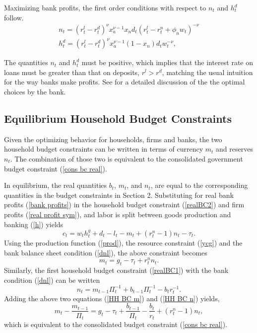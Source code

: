 \documentclass[]{article}
\begin{document}
Maximizing bank profits, the first order conditions with respect to $n_{t}$ and $h_{t}^{d}$ follow.
\begin{eqnarray}
  n_{t}=(r^l_{t}-r^d_{t})^{\nu}x_{a}^{\nu-1}x_{n}d_{t}(r^{l}_{t}-r^{n}_{t}+\phi_{n}w_{t})^{-\nu}  \label{foc n} \\ 
  h^{d}_{t}=(r^l_{t}-r^d_{t})^{\nu}x_{a}^{\nu-1}(1-x_{n})d_{t}w_{t}^{-\nu},  \label{foc hd}
\end{eqnarray}

The quantities $n_{t}$ and $h_{t}^{d}$ must be positive, which implies that the interest rate on loans must be greater than that on deposits, $r^l>r^d$, matching the usual intuition for the way banks make profits. See \textcite{ireland2014macroeconomics} for a detailed discussion of the the optimal choices by the bank.

\subsection{Equilibrium Household Budget Constraints}

Given the optimizing behavior for households, firms and banks, the two household budget constraints can be written in terms of currency $m_{t}$ and reserves $n_{t}$. The combination of those two is equivalent to the consolidated government budget constraint (\ref{cons bc real}).

In equilibrium, the real quantities $b_{t}$, $m_{t}$, and $n_{t}$, are equal to the corresponding quantities in the budget constraints in Section 2. Substituting for real bank profits (\ref{bank profits}) in the household budget constraint (\ref{realBC2}) and firm profits (\ref{real profit sym}), and labor is split between goods production and banking (\ref{h}) yields
\[c_{t}=w_{t}h_{t}^{g}+d_{t}-l_{t}-m_{t}+\left(
r_{t}^{n}-1\right) n_{t}-\tau_{t}.\]
Using the production function (\ref{prod}), the resource constraint (\ref{ycg}) and the bank balance sheet condition (\ref{dnl}), the above constraint becomes
\begin{equation}
    m_{t}=g_{t}-\tau_{t}+r^{n}_{t}n_{t}.
    \label{HH BC m}
\end{equation}
Similarly, the first household budget constraint (\ref{realBC1}) with the bank condition (\ref{dnl}) can be written
\begin{equation}
    n_{t}=m_{t-1}\Pi_{t}^{-1}+b_{t-1}\Pi_{t}^{-1}-b_{t}r_{t}^{-1}.
    \label{HH BC n}
\end{equation}
Adding the above two equations (\ref{HH BC m}) and (\ref{HH BC n}) yields,
\begin{equation} \label{policy BC}
m_{t}-\frac{m_{t-1}}{\Pi_{t}}=g_{t}-\tau_{t}+\frac{b_{t-1}}{\Pi_t}-\frac{b_{t}}{r_{t}}+\left(r_{t}^{n}-1\right) n_{t},
\end{equation}
which is equivalent to the consolidated budget constraint (\ref{cons bc real}).
\end{document}
